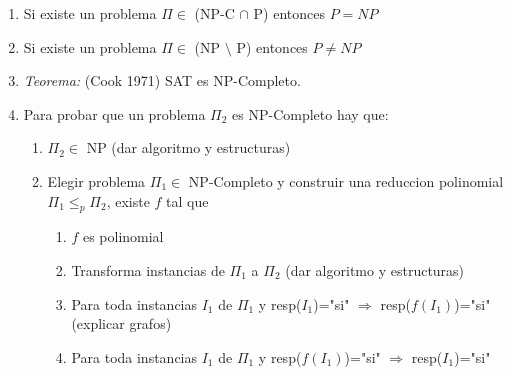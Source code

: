 \begin{enumerate}
\item Si existe un problema $\Pi \in$ (NP-C $\cap$ P) entonces $P=NP$
\item Si existe un problema $\Pi \in$ (NP $\setminus$ P) entonces $P\neq NP$
\item \textit{Teorema:} (Cook 1971) SAT es NP-Completo.
\item Para probar que un problema $\Pi_{2}$ es NP-Completo hay que:
   \begin{enumerate}
   \item $\Pi_{2} \in$ NP (dar algoritmo y estructuras)
   \item Elegir problema $\Pi_{1} \in$ NP-Completo y construir una reduccion polinomial $\Pi_{1} \leq_{p} \Pi_{2}$, existe $f$ tal que
      \begin{enumerate}
      \item $f$ es polinomial
      \item Transforma instancias de $\Pi_{1}$ a $\Pi_{2}$ (dar algoritmo y estructuras)
      \item Para toda instancias $I_{1}$ de $\Pi_{1}$ y resp($I_{1}$)="si" $\Rightarrow$ resp($f(I_{1})$)="si" (explicar grafos)
      \item Para toda instancias $I_{1}$ de $\Pi_{1}$ y resp($f(I_{1})$)="si" $\Rightarrow$ resp($I_{1}$)="si"
      \end{enumerate}
   \end{enumerate}
\end{enumerate}
